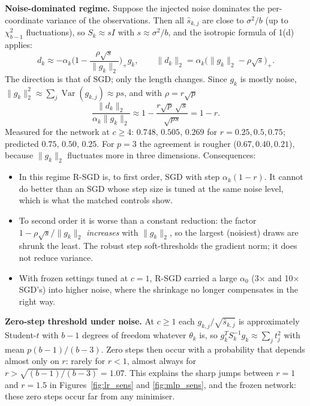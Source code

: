 \documentclass[11pt,a4paper]{article}
\newcommand{\norm}[1]{\lVert #1\rVert_2}
\DeclareMathOperator{\Var}{Var}
\begin{document}
\textbf{Noise-dominated regime.} Suppose the injected noise dominates the per-coordinate
variance of the observations. Then all $\widehat s_{k,j}$ are close to $\sigma^2/b$ (up to
$\chi^2_{b-1}$ fluctuations), so $S_k\approx sI$ with $s\approx\sigma^2/b$, and the
isotropic formula of 1(d) applies:
\begin{equation*}
d_k\approx-\alpha_k\Big(1-\frac{\rho\sqrt s}{\norm{g_k}}\Big)_+g_k,\qquad
\norm{d_k}=\alpha_k\big(\norm{g_k}-\rho\sqrt s\big)_+ .
\end{equation*}
The direction is that of SGD; only the length changes. Since $g_k$ is mostly noise,
$\norm{g_k}^2\approx\sum_j\Var(g_{k,j})\approx ps$, and with $\rho=r\sqrt p$
\begin{equation*}
\frac{\norm{d_k}}{\alpha_k\norm{g_k}}\approx1-\frac{r\sqrt p\,\sqrt s}{\sqrt{ps}}=1-r .
\end{equation*}
Measured for the network at $c\ge4$: $0.748,\,0.505,\,0.269$ for $r=0.25,0.5,0.75$; predicted
$0.75,\,0.50,\,0.25$. For $p=3$ the agreement is rougher ($0.67,0.40,0.21$), because
$\norm{g_k}$ fluctuates more in three dimensions. Consequences:
\begin{itemize}
\item In this regime R-SGD is, to first order, SGD with step $\alpha_k(1-r)$. It cannot do better
than an SGD whose step size is tuned at the same noise level, which is what the matched
controls show.
\item To second order it is worse than a constant reduction: the factor
$1-\rho\sqrt s/\norm{g_k}$ \emph{increases} with $\norm{g_k}$, so the largest (noisiest) draws are
shrunk the least. The robust step soft-thresholds the gradient norm; it does not reduce variance.
\item With frozen settings tuned at $c=1$, R-SGD carried a large $\alpha_0$ (3$\times$ and
10$\times$ SGD's) into higher noise, where the shrinkage no longer compensates in the right way.
\end{itemize}

\textbf{Zero-step threshold under noise.} At $c\ge1$ each $g_{k,j}/\sqrt{\widehat s_{k,j}}$ is
approximately Student-$t$ with $b-1$ degrees of freedom whatever $\theta_k$ is, so
$g_k^TS_k^{-1}g_k\approx\sum_jt_j^2$ with mean $p(b-1)/(b-3)$. Zero steps then occur with a
probability that depends almost only on $r$: rarely for $r<1$, almost always for
$r>\sqrt{(b-1)/(b-3)}=1.07$. This explains the sharp jumps between $r=1$ and $r=1.5$ in
Figures~\ref{fig:lr_sens} and \ref{fig:mlp_sens}, and the frozen network: these zero steps
occur far from any minimiser.
\end{document}
